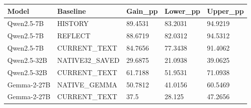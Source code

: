 \begin{tabular}{lllll}
Model & Baseline & Gain\_pp & Lower\_pp & Upper\_pp \\
\hline
Qwen2.5-7B & HISTORY & 89.4531 & 83.2031 & 94.9219 \\
Qwen2.5-7B & REFLECT & 88.6719 & 82.0312 & 94.5312 \\
Qwen2.5-7B & CURRENT\_TEXT & 84.7656 & 77.3438 & 91.4062 \\
Qwen2.5-32B & NATIVE32\_SAVED & 29.6875 & 21.0938 & 39.0625 \\
Qwen2.5-32B & CURRENT\_TEXT & 61.7188 & 51.9531 & 71.0938 \\
Gemma-2-27B & NATIVE\_GEMMA & 50.7812 & 41.0156 & 60.5469 \\
Gemma-2-27B & CURRENT\_TEXT & 37.5 & 28.125 & 47.2656 \\
\end{tabular}
